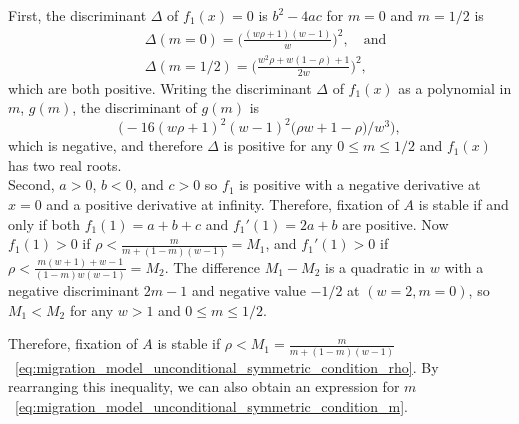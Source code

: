 \documentclass[14pt]{extarticle}
\begin{document}
First, the discriminant $\Delta$ of $f_1(x)=0$ is $b^2-4ac$ for $m=0$ and $m=1/2$ is
\begin{equation}\begin{aligned}
&\Delta(m=0) = \Big(\frac{(w \rho + 1) (w-1)}{w}\Big)^2, \quad \text{and} \\
&\Delta(m=1/2) = \Big(\frac{w^2 \rho + w(1-\rho) + 1}{2 w}\Big)^2,
\end{aligned}\end{equation}
which are both positive. 
Writing the discriminant $\Delta$ of $f_1(x)$ as a polynomial in $m$, $g(m)$, the discriminant of $g(m)$ is
$$
\big(- 16 (w\rho + 1)^2 (w - 1)^2 \big(\rho w + 1 - \rho \big) / w^3\big),
$$
which is negative, and therefore $\Delta$ is positive for any $0 \le m \le 1/2$ and $f_1(x)$ has two real roots. \\
Second, $a>0$, $b<0$, and $c>0$ so $f_1$ is positive with a negative derivative at $x=0$ and  a positive derivative at infinity.
Therefore, fixation of $A$ is stable {\color{red}if and only if} both $f_1(1)=a+b+c$ and $f_1'(1)=2a+b$ are positive.
{\color{red}Now $f_1(1)>0$  if $\rho < \frac{m}{m+(1-m)(w-1)}=M_1$, and
$f_1'(1)>0$  if $\rho < \frac{m(w+1)+w-1}{(1-m)w(w-1)}=M_2$.
The difference $M_1-M_2$ is a quadratic in $w$ with a negative discriminant $2m-1$ and negative value $-1/2$ at $(w=2, m=0)$, so $M_1<M_2$ for any $w>1$ and $0 \le m \le 1/2$.}

Therefore, fixation of $A$ is stable if {\color{red}$\rho < M_1 = \frac{m}{m+(1-m)(w-1)}$}~\eqref{eq:migration_model_unconditional_symmetric_condition_rho}. By rearranging this inequality, we can also obtain an expression for $m$~\eqref{eq:migration_model_unconditional_symmetric_condition_m}.
\end{document}
